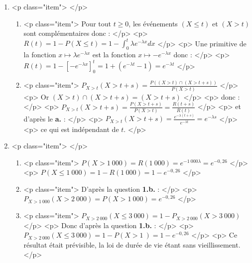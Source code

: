 \begin{enumerate}
     \item <p class="item">
     </p>
     \begin{enumerate}
          \item <p class="item">  Pour tout $t\geqslant 0$, les événements $\left(X\leqslant t\right)$ et $\left(X > t\right)$ sont complémentaires donc :
          </p>
          <p>
          $R\left(t\right)=1-P\left(X\leqslant t\right)=1-\int_{0}^{t}\lambda  e^{-\lambda  x}dx$
          </p>
          <p>
          Une primitive de la fonction $x\mapsto \lambda  e^{-\lambda  x}$ est la fonction  $x\mapsto -e^{-\lambda  x}$ donc :
          </p>
          <p>
          $R\left(t\right)=1-\left[-e^{-\lambda  x}\right]_{0}^{t}=1+\left(e^{-\lambda  t}-1\right)=e^{-\lambda  t}$
          </p>
          \item <p class="item">  $P_{X > t}\left(X > t+s\right)=\frac{P\left(\left(X > t\right) \cap  \left(X > t+s\right)\right)}{P\left(X > t\right)}$
          </p>
          <p>
          Or $\left(X > t\right) \cap  \left(X > t+s\right)=\left(X > t+s\right)$
          </p>
          <p>
          donc :
          </p>
          <p>
          $P_{X > t}\left(X > t+s\right)=\frac{P\left(X > t+s\right)}{P\left(X > t\right)}=\frac{R\left(t+s\right)}{R\left(t\right)}$
          </p>
          <p>
          et d'après le \textbf{a.} :
          </p>
          <p>
          $P_{X > t}\left(X > t+s\right)=\frac{e^{-\lambda  \left(t+s\right)}}{e^{-\lambda  t}}=e^{-\lambda  s}$
          </p>
          <p>
          ce qui est indépendant de $t$.
          </p>
     \end{enumerate}
     \item <p class="item">
     </p>
     \begin{enumerate}
          \item <p class="item">
          $P\left(X > 1~000\right)=R\left(1~000\right)=e^{-1~000\lambda }=e^{-0,26}$
          </p>
          <p>
          $P\left(X\leqslant 1~000\right)=1-R\left(1~000\right)=1-e^{-0,26}$
          </p>
          \item <p class="item">  D'après la question \textbf{1.b.} :
          </p>
          <p>
          $P_{X > 1~000}\left(X > 2~000\right)=P\left(X > 1~000\right)=e^{-0,26}$
          </p>
          \item <p class="item"> $P_{X > 2~000}\left(X\leqslant 3~000\right)=1-P_{X > 2~000}\left(X > 3~000\right) $
          </p>
          <p>
          Donc d'après la question \textbf{1.b.} :
          </p>
          <p>
          $P_{X > 2~000}\left(X\leqslant 3~000\right)=1-P\left(X > 1~\right)=1-e^{-0,26}$
          </p>
          <p>
          Ce résultat était prévisible, la loi de durée de vie étant sans vieillissement.
          </p>
     \end{enumerate}
\end{enumerate}
